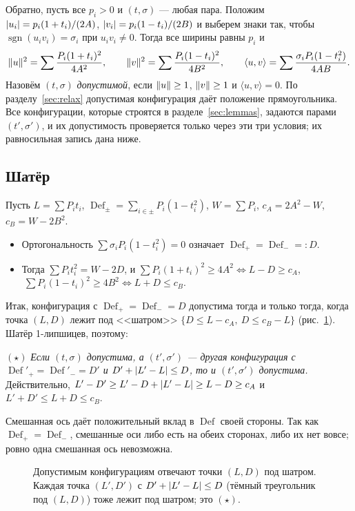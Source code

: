 \documentclass[11pt]{article}
\theoremstyle{definition}
\theoremstyle{remark}
\newcommand{\Def}{\operatorname{Def}}
\newcommand{\sgn}{\operatorname{sgn}}
\DeclarePairedDelimiter{\abs}{\lvert}{\rvert}
\DeclarePairedDelimiter{\norm}{\lVert}{\rVert}
\begin{document}
Обратно, пусть все $p_i>0$ и $(t,\sigma)$ --- любая пара. Положим $\abs{u_i}=p_i(1+t_i)/(2A)$,
$\abs{v_i}=p_i(1-t_i)/(2B)$ и выберем знаки так, чтобы $\sgn(u_iv_i)=\sigma_i$ при $u_iv_i\ne0$. Тогда все
ширины равны $p_i$ и
\[
\norm u^2=\sum\frac{P_i(1+t_i)^2}{4A^2},\qquad \norm v^2=\sum\frac{P_i(1-t_i)^2}{4B^2},\qquad
\langle u,v\rangle=\sum\frac{\sigma_iP_i(1-t_i^2)}{4AB}.
\]
Назовём $(t,\sigma)$ \emph{допустимой}, если $\norm u\ge1$, $\norm v\ge1$ и $\langle u,v\rangle=0$. По
разделу~\ref{sec:relax} допустимая конфигурация даёт положение прямоугольника. Все конфигурации, которые
строятся в разделе~\ref{sec:lemmas}, задаются парами $(t',\sigma')$, и их допустимость проверяется только
через эти три условия; их равносильная запись дана ниже.

\subsection{Шатёр}\label{sec:tent}
Пусть $L=\sum P_it_i$, $\Def_\pm=\sum_{i\in\pm}P_i(1-t_i^2)$, $W=\sum P_i$, $c_A=2A^2-W$, $c_B=W-2B^2$.
\begin{itemize}
\item Ортогональность $\sum\sigma_iP_i(1-t_i^2)=0$ означает $\Def_+=\Def_-=:D$.
\item Тогда $\sum P_it_i^2=W-2D$, и
$\sum P_i(1+t_i)^2\ge4A^2\iff L-D\ge c_A$, $\ \sum P_i(1-t_i)^2\ge4B^2\iff L+D\le c_B$.
\end{itemize}
Итак, конфигурация с $\Def_+=\Def_-=D$ допустима тогда и только тогда, когда точка $(L,D)$ лежит под
<<шатром>> $\{D\le L-c_A,\ D\le c_B-L\}$ (рис.~\ref{fig:tent}). Шатёр 1-липшицев, поэтому:

\medskip\noindent$(\star)$ \emph{Если $(t,\sigma)$ допустима, а $(t',\sigma')$ --- другая конфигурация с
$\Def'_+=\Def'_-=D'$ и $D'+\abs{L'-L}\le D$, то и $(t',\sigma')$ допустима.}
Действительно, $L'-D'\ge L'-D+\abs{L'-L}\ge L-D\ge c_A$ и $L'+D'\le L+D\le c_B$.

\medskip
Смешанная ось даёт положительный вклад в $\Def$ своей стороны. Так как $\Def_+=\Def_-$, смешанные оси либо
есть на обеих сторонах, либо их нет вовсе; ровно одна смешанная ось невозможна.

\begin{figure}[ht]
\centering
{}
\caption{Допустимым конфигурациям отвечают точки $(L,D)$ под шатром. Каждая точка $(L',D')$ с
$D'+\abs{L'-L}\le D$ (тёмный треугольник под $(L,D)$) тоже лежит под шатром; это $(\star)$.}
\label{fig:tent}
\end{figure}
\end{document}
